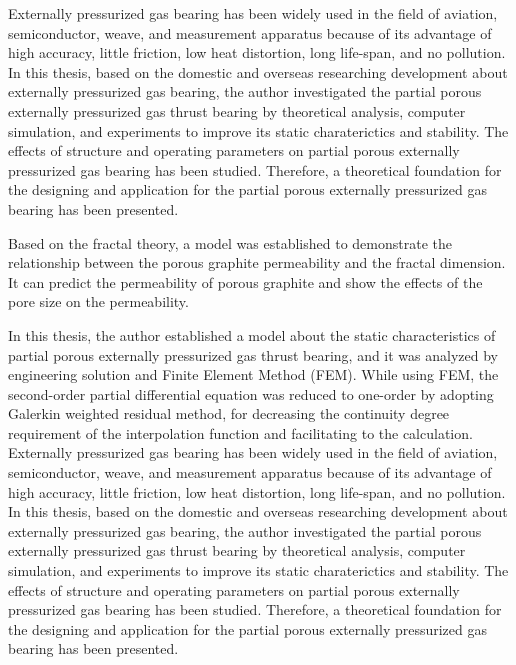 \begin{eabstract}
   
   Externally pressurized gas bearing has been widely used in the field of aviation, semiconductor, weave, and measurement apparatus because of its advantage of high accuracy, little friction, low heat distortion, long life-span, and no pollution. In this thesis, based on the domestic and overseas researching development about externally pressurized gas bearing, the author investigated the partial porous externally pressurized gas thrust bearing by theoretical analysis, computer simulation, and experiments to improve its static charaterictics and stability. The effects of structure and operating parameters on partial porous externally pressurized gas bearing has been studied. Therefore, a theoretical foundation for the designing and application for the partial porous externally pressurized gas bearing has been presented. 

Based on the fractal theory, a model was established to demonstrate the relationship between the porous graphite permeability and the fractal dimension. It can predict the permeability of porous graphite and show the effects of the pore size on the permeability. 

In this thesis, the author established a model about the static characteristics of partial porous externally pressurized gas thrust bearing, and it was analyzed by engineering solution and Finite Element Method (FEM). While using FEM, the second-order partial differential equation was reduced to one-order by adopting Galerkin weighted residual method, for decreasing the continuity degree requirement of the interpolation function and facilitating to the calculation. Externally pressurized gas bearing has been widely used in the field of aviation, semiconductor, weave, and measurement apparatus because of its advantage of high accuracy, little friction, low heat distortion, long life-span, and no pollution. In this thesis, based on the domestic and overseas researching development about externally pressurized gas bearing, the author investigated the partial porous externally pressurized gas thrust bearing by theoretical analysis, computer simulation, and experiments to improve its static charaterictics and stability. The effects of structure and operating parameters on partial porous externally pressurized gas bearing has been studied. Therefore, a theoretical foundation for the designing and application for the partial porous externally pressurized gas bearing has been presented. 


\end{eabstract}

